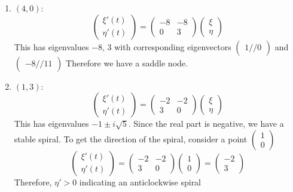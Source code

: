 \documentclass{article}
\begin{document}
\begin{eg}
\begin{enumerate}[cases]
        \item $(4, 0)$:
        \[
            \begin{pmatrix}
                \xi'(t) \\ \eta'(t)
            \end{pmatrix} = \begin{pmatrix}
                -8 & -8 \\
                0 & 3
            \end{pmatrix} \begin{pmatrix}
                \xi \\ \eta
            \end{pmatrix}
        \]
        This has eigenvalues $-8$, $3$ with corresponding eigenvectors $\begin{pmatrix}
            1 // 0
        \end{pmatrix}$ and $\begin{pmatrix}
            -8 // 11
        \end{pmatrix}$
        Therefore we have a saddle node.

        \item $(1, 3)$:
        \[
            \begin{pmatrix}
                \xi'(t) \\ \eta'(t)
            \end{pmatrix} = \begin{pmatrix}
                -2 & -2 \\
                3 & 0
            \end{pmatrix} \begin{pmatrix}
                \xi \\ \eta
            \end{pmatrix}
        \]
        This has eigenvalues $-1 \pm i \sqrt{5}$. 
        Since the real part is negative, we have a stable spiral.
        To get the direction of the spiral, consider a point $\begin{pmatrix}
            1 \\ 0
        \end{pmatrix}$
        \[
            \begin{pmatrix}
                \xi'(t) \\ \eta'(t)
            \end{pmatrix} = \begin{pmatrix}
                -2 & -2 \\
                3 & 0
            \end{pmatrix} \begin{pmatrix}
                1 \\ 0
            \end{pmatrix} = \begin{pmatrix}
                -2 \\ 3
            \end{pmatrix}
        \]
        Therefore, $\eta' > 0$ indicating an anticlockwise spiral
    \end{enumerate}


\end{eg}
\end{document}
